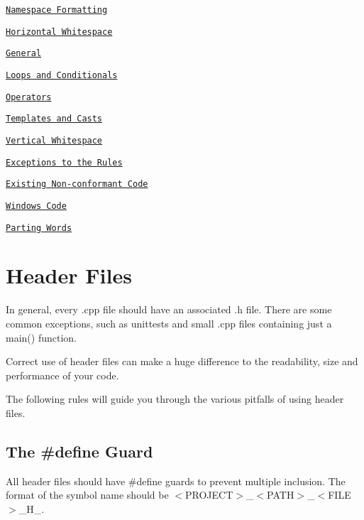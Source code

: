 \begin{DoxyItemize}
\begin{DoxyItemize}
\item \href{#namespace-formatting}{\tt Namespace Formatting}
\item \href{#horizontal-whitespace}{\tt Horizontal Whitespace}
\begin{DoxyItemize}
\item \href{#general}{\tt General}
\item \href{#loops-and-conditionals}{\tt Loops and Conditionals}
\item \href{#operators}{\tt Operators}
\item \href{#templates-and-casts}{\tt Templates and Casts}
\end{DoxyItemize}
\item \href{#vertical-whitespace}{\tt Vertical Whitespace}
\end{DoxyItemize}
\item \href{#exceptions-to-the-rules}{\tt Exceptions to the Rules}
\begin{DoxyItemize}
\item \href{#existing-non-conformant-code}{\tt Existing Non-\/conformant Code}
\item \href{#windows-code}{\tt Windows Code}
\end{DoxyItemize}
\item \href{#parting-words}{\tt Parting Words}
\end{DoxyItemize}

\section*{Header Files}

In general, every {\ttfamily .cpp} file should have an associated {\ttfamily .h} file. There are some common exceptions, such as unittests and small {\ttfamily .cpp} files containing just a {\ttfamily main()} function.

Correct use of header files can make a huge difference to the readability, size and performance of your code.

The following rules will guide you through the various pitfalls of using header files.

\subsection*{The \#define Guard}

All header files should have {\ttfamily \#define} guards to prevent multiple inclusion. The format of the symbol name should be {\ttfamily $<$P\+R\+O\+J\+E\+CT$>$\+\_\+$<$P\+A\+TH$>$\+\_\+$<$F\+I\+LE$>$\+\_\+\+H\+\_\+.}

